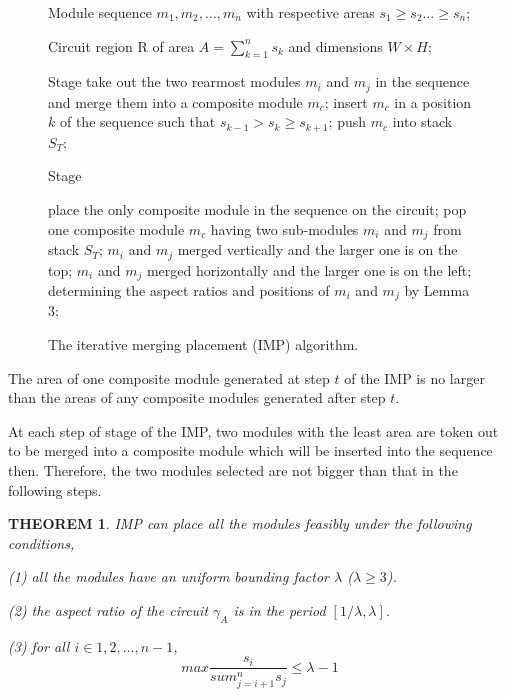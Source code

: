 \documentclass[conference]{IEEEtran}
\begin{document}
\begin{figure}[!t]
\centering

\begin{algorithmic}[]
\footnotesize
\REQUIRE
Module sequence $m_1, m_2, \ldots , m_n$ with respective areas $s_1 \ge s_2 \ldots \ge s_n$;

Circuit region R of area $A=\sum_{k=1}^ns_k$ and dimensions $W \times H$;

\STATE Stage \uppercase \expandafter {}
\STATE take out the two rearmost modules $m_i$ and $m_j$ in the sequence and merge them into a composite module $m_c$;
\STATE insert $m_c$ in a position $k$ of the sequence such that $s_{k-1} > s_k \ge s_{k+1}$;
\STATE push $m_c$ into stack $S_T$;
\ENDWHILE

\STATE Stage \uppercase \expandafter {}

\STATE place the only composite module in the sequence on the circuit;
   \STATE pop one composite module $m_c$ having two sub-modules $m_i$ and $m_j$ from stack $S_T$;
      \STATE $m_i$ and $m_j$ merged vertically and the larger one is on the top;
   \ELSE
      \STATE $m_i$ and $m_j$ merged horizontally and the larger one is on the left;
   \ENDIF
   \STATE determining the aspect ratios and positions of $m_i$ and $m_j$ by Lemma 3;
\ENDWHILE

\caption{The iterative merging placement (IMP) algorithm.}
\end{algorithmic}
\end{figure}


\begin{lemma}
The area of one composite module generated at step $t$ of the IMP is no larger than the areas of any composite modules generated after step $t$.
\end{lemma}

At each step of stage \uppercase \expandafter {} of the IMP, two modules with the least area are token out to be merged into a composite module which will be inserted into the sequence then. Therefore, the two modules selected are not bigger than that in the following steps.


\newtheorem{theorem}{THEOREM}
\begin{theorem} IMP can place all the modules feasibly under the following conditions,

(1) all the modules have an uniform bounding factor $\lambda$ ($\lambda \ge 3$).

(2) the aspect ratio of the circuit $\gamma_A$ is in the period $[1/\lambda,\lambda]$.

(3) for all $i \in {1,2,\ldots,n-1}$,
   $$max \frac{s_i}{sum_{j=i+1}^n s_j} \le \lambda-1$$

\end{theorem}
\end{document}
